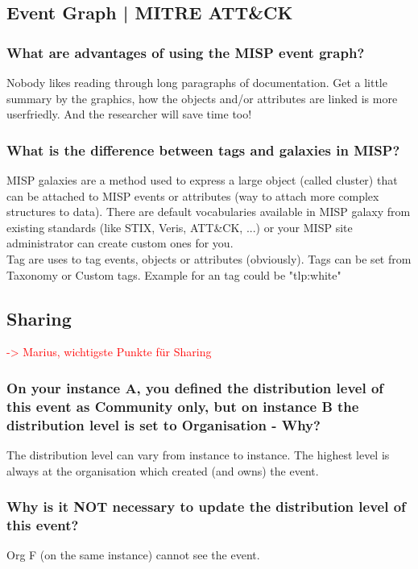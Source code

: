 \subsection{Event Graph | MITRE ATT\&CK}

\subsubsection{What are advantages of using the MISP event graph?}
Nobody likes reading through long paragraphs of documentation. Get a little summary by the graphics, how the objects and/or attributes are linked is more userfriedly. And the researcher will save time too!

\subsubsection{What is the difference between tags and galaxies in MISP?}
MISP galaxies are a method used to express a large object (called cluster) that can be attached to MISP events or attributes (way to attach more complex structures to data). There are default vocabularies available in MISP galaxy from existing standards (like STIX, Veris, ATT\&CK, ...) or your MISP site administrator can create custom ones for you.\\

Tag are uses to tag events, objects or attributes (obviously). Tags can be set from Taxonomy or Custom tags. Example for an tag could be "tlp:white"

\subsection{Sharing}

\textcolor{red}{-> Marius, wichtigste Punkte für Sharing}

\subsubsection{On your instance A, you defined the distribution level of this event as Community only, but on instance B the distribution level is set to Organisation - Why?}
The distribution level can vary from instance to instance. The highest level is always at the organisation which created (and owns) the event.

\subsubsection{Why is it NOT necessary to update the distribution level of this event?}
Org F (on the same instance) cannot see the event.

